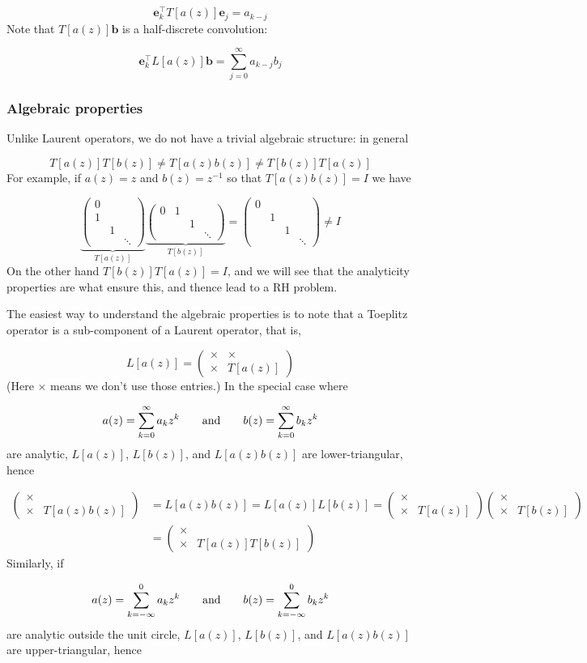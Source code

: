\documentclass[12pt,a4paper]{article}
\def\qqand{\qquad\hbox{and}\qquad}
\def\vc#1{ {\mathbf #1} }
\def\addtab#1={#1\;&=}
\def\ccr{\\\addtab}
\def\sopmatrix#1{ \begin{pmatrix}#1\end{pmatrix} }
\def\addtab#1={#1\;&=}
\def\ccr{\\\addtab}
\begin{document}
\[
\vc e_k^\top T[a(z)] \vc e_j = a_{k-j}
\]
Note that $T[a(z)] \vc b$ is a half-discrete convolution:

\[
\vc e_k^\top L[a(z)] \vc b = \sum_{j=0}^\infty a_{k-j} b_j
\]
\subsubsection{Algebraic properties}
Unlike Laurent operators, we do not have a trivial algebraic structure: in general

\[
T[a(z)] T[b(z)] \neq T[a(z) b(z)] \neq T[b(z)] T[a(z)]
\]
For example, if $a(z) = z$ and $b(z) = z^{-1}$ so that $T[a(z)b(z)] = I$ we have

\[
\underbrace{\sopmatrix{0 \\ 1 \\ & 1 \\ &&\ddots}}_{T[a(z)]} \underbrace{\sopmatrix{0 & 1 \\ & & 1 \\ &&&\ddots}}_{T[b(z)]} = \sopmatrix{0 \\ & 1 \\ && 1 \\ &&& \ddots} \neq I
\]
On the other hand $T[b(z)] T[a(z)] = I$, and we will see that the analyticity properties  are what ensure this, and thence lead to a RH problem. 

The easiest way to understand the algebraic properties is to note that a Toeplitz operator is  a sub-component of a Laurent operator, that is,

\[
L[a(z)] = \sopmatrix{
\times & \times \\ \times & T[a(z)]
}
\]
(Here $\times$ means we don't use those entries.) In the special case where 

\[
a(z) = \sum_{k=0}^\infty a_k z^k \qqand b(z) = \sum_{k=0}^\infty b_k z^k
\]
are analytic, $L[a(z)]$, $L[b(z)]$, and $L[a(z) b(z)]$ are lower-triangular, hence


\begin{align*}
\sopmatrix{
\times &  \\ \times & T[a(z) b(z)]
} &= L[a(z)b(z)] = L[a(z)] L[b(z)] =  \sopmatrix{
\times &  \\ \times & T[a(z)]
} \sopmatrix{
\times &  \\ \times & T[b(z)]
} \ccr
= \sopmatrix{
\times &  \\ \times & T[a(z)] T[b(z)]
}
\end{align*}
Similarly, if 

\[
a(z) = \sum_{k=-\infty}^0 a_k z^k \qqand b(z) = \sum_{k=-\infty}^0 b_k z^k
\]
are analytic outside the unit circle,  $L[a(z)]$, $L[b(z)]$, and $L[a(z) b(z)]$ are upper-triangular, hence
\end{document}
